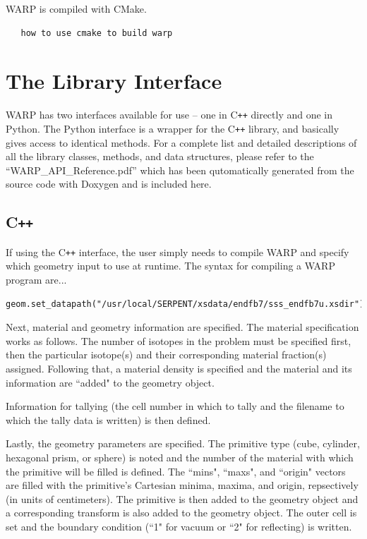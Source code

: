 \documentclass[twoside,a4paper]{refart}
\begin{document}
WARP is compiled with CMake.

\begin{verbatim}
   how to use cmake to build warp
\end{verbatim}


\section{The Library Interface}

WARP has two interfaces available for use -- one in C\texttt{++} directly and one in Python.  The Python interface is a wrapper for the C\texttt{++} library, and basically gives access to identical methods.  For a complete list and detailed descriptions of all the library classes, methods, and data structures, please refer to the ``WARP\_API\_Reference.pdf'' which has been qutomatically generated from the source code with Doxygen and is included here.

\subsection{C\texttt{++}}

If using the C\texttt{++} interface, the user simply needs to compile WARP and specify which geometry
input to use at runtime. The syntax for compiling a WARP program are...



\begin{verbatim}
geom.set_datapath("/usr/local/SERPENT/xsdata/endfb7/sss_endfb7u.xsdir");
\end{verbatim}

Next, material and geometry information are specified. The material specification works as follows. The 
number of isotopes in the problem must be specified first, then the particular isotope(s) and their 
corresponding material fraction(s) assigned. Following that, a material density is specified and the 
material and its information are ``added" to the geometry object.

Information for tallying (the cell number in which to tally and the filename to which the tally data is written) is then defined.

Lastly, the geometry parameters are specified. The primitive type (cube, cylinder, hexagonal prism, or sphere) is noted and the number of the material with which the primitive will be filled is defined. The 
``mins", ``maxs", and ``origin" vectors are filled with the primitive's Cartesian minima, maxima, and origin, repsectively (in units of centimeters). The primitive is then added to the geometry object and a corresponding transform is also added to the geometry object. The outer cell is set and the boundary
condition (``1" for vacuum or ``2" for reflecting) is written.
\end{document}
